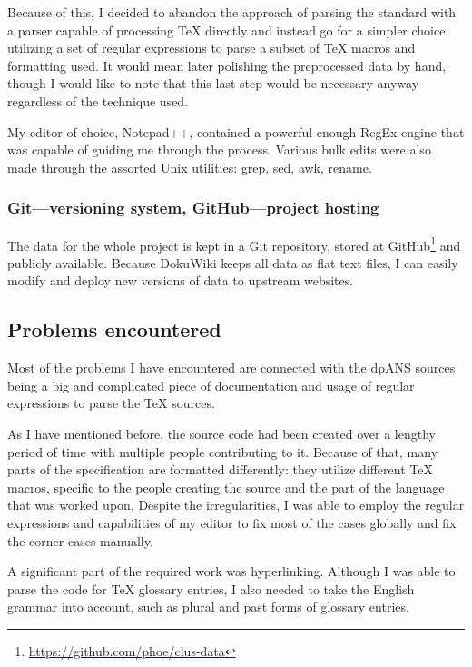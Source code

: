 Because of this, I decided to abandon the approach of parsing the standard with a parser capable of processing \TeX{} directly and instead go for a simpler choice: utilizing a set of regular expressions to parse a subset of \TeX{} macros and formatting used. It would mean later polishing the preprocessed data by hand, though I would like to note that this last step would be necessary anyway regardless of the technique used.

My editor of choice, Notepad++, contained a powerful enough RegEx engine that was capable of guiding me through the process. Various bulk edits were also made through the assorted Unix utilities: grep, sed, awk, rename.

\subsubsection{Git---versioning system, GitHub---project hosting}

The data for the whole project is kept in a Git repository, stored at GitHub\footnote{\url{https://github.com/phoe/clus-data}} and publicly available. Because DokuWiki keeps all data as flat text files, I can easily modify and deploy new versions of data to upstream websites.

\subsection{Problems encountered}

Most of the problems I have encountered are connected with the dpANS sources being a big and complicated piece of documentation and usage of regular expressions to parse the \TeX{} sources.

As I have mentioned before, the source code had been created over a lengthy period of time with multiple people contributing to it. Because of that, many parts of the specification are formatted differently: they utilize different \TeX{} macros, specific to the people creating the source and the part of the language that was worked upon. Despite the irregularities, I was able to employ the regular expressions and capabilities of my editor to fix most of the cases globally and fix the corner cases manually.

A significant part of the required work was hyperlinking. Although I was able to parse the code for \TeX{} glossary entries, I also needed to take the English grammar into account, such as plural and past forms of glossary entries.


